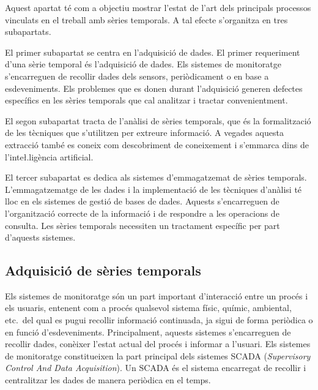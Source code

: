 Aquest apartat té com a objectiu mostrar l'estat de l'art dels
principals processos vinculats en el treball amb sèries temporals. A
tal efecte s'organitza en tres subapartats.
 

El primer subapartat se centra en l'adquisició de dades. El primer
requeriment d'una sèrie temporal és l'adquisició de dades. Els
sistemes de monitoratge s'encarreguen de recollir dades dels sensors,
periòdicament o en base a esdeveniments.  Els problemes que es donen
durant l'adquisició generen defectes específics en les sèries
temporals que cal analitzar i tractar convenientment.


El segon subapartat tracta de l'anàlisi de sèries temporals, que és
la formalització de les tècniques que s'utilitzen per extreure
informació. A vegades aquesta extracció també es coneix com
descobriment de coneixement i s'emmarca dins de l'inte\l.ligència
artificial.


El tercer subapartat es dedica als sistemes d'emmagatzemat de sèries
temporals. L'emmagatzematge de les dades i la implementació de les
tècniques d'anàlisi té lloc en els sistemes de gestió de bases de
dades. Aquests s'encarreguen de l'organització correcte de la
informació i de respondre a les operacions de consulta. Les sèries
temporals necessiten un tractament específic per part d'aquests
sistemes.






\subsection{Adquisició de sèries temporals}

Els sistemes de monitoratge són un part important d'interacció entre
un procés i els usuaris, entenent com a procés qualsevol sistema
físic, químic, ambiental, etc.\ del qual es pugui recollir informació
continuada, ja sigui de forma periòdica o en funció
d'esdeveniments. Principalment, aquests sistemes s'encarreguen de
recollir dades, conèixer l'estat actual del procés i informar a
l'usuari. Els sistemes de monitoratge constitueixen la part principal
dels sistemes SCADA (\emph{Supervisory Control And Data
  Acquisition}). Un SCADA és el sistema encarregat de recollir i
centralitzar les dades de manera periòdica en el temps.



%     


